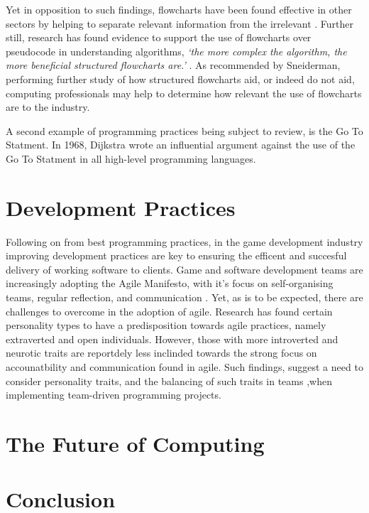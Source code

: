 \documentclass{scrartcl}
\begin{document}
Yet in opposition to such findings, flowcharts have been found effective in other sectors by helping to separate relevant information from the irrelevant \cite{Kammann1975}. Further still, research has found evidence to support the use of flowcharts over pseudocode in understanding algorithms, \textit{‘the more complex the algorithm, the more beneficial structured flowcharts are.’} \cite{Scanian}. As recommended by Sneiderman, performing further study of how structured flowcharts aid, or indeed do not aid, computing professionals may help to determine how relevant the use of flowcharts are to the industry.

A second example of programming practices being subject to review, is the Go To Statment. In 1968, Dijkstra wrote an influential argument against the use of the Go To Statment in all high-level programming languages. 

\section{Development Practices}

Following on from best programming practices, in the game development industry improving development practices are key to ensuring the efficent and succesful delivery of working software to clients. Game and software development teams are increasingly adopting the Agile Manifesto, with it's focus on self-organising teams, regular reflection, and communication \cite{Agile}. Yet, as is to be expected, there are challenges to overcome in the adoption of agile. Research has found certain personality types to have a predisposition towards agile practices, namely extraverted and open individuals\cite{BishopDeokar}. However, those with more introverted and neurotic traits are reportdely less inclinded towards the strong focus on accounatbility and communication found in agile. Such findings, suggest a need to consider personality traits, and the balancing of such traits in teams ,when implementing team-driven programming projects.


\section{The Future of Computing}


\section{Conclusion}





\end{document}
